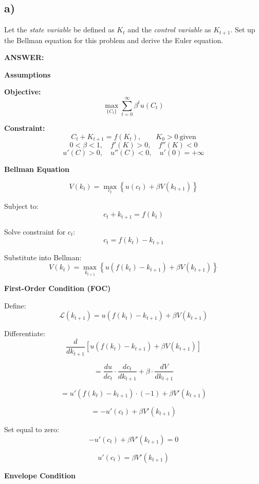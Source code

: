 \documentclass[12pt]{article}
\begin{document}
\doublespacing

\subsection*{\noindent\textbf{a)}}

\noindent Let the \textit{state variable} be defined as \( K_t \) and the \textit{control variable} as \( K_{t+1} \). Set up the Bellman equation for this problem and derive the Euler equation.

\vspace{0.5em}
\noindent\textcolor{formalred}{\textbf{ANSWER:}}

\singlespacing
\textbf{Assumptions}

\textbf{Objective:}
\[
\max_{\{C_t\}} \sum_{t=0}^{\infty} \beta^t u(C_t)
\]

\textbf{Constraint:}
\[
C_t + K_{t+1} = f(K_t), 
\qquad K_0>0 \ \text{given}
\]
\[
0<\beta<1,\quad f'(K)>0,\quad f''(K)<0
\]
\[
u'(C)>0,\quad u''(C)<0,\quad u'(0)=+\infty
\]


\textbf{Bellman Equation}

\[
V(k_t) = \max_{c_t} \left\{ u(c_t) + \beta V(k_{t+1}) \right\}
\]

Subject to:
\[
c_t + k_{t+1} = f(k_t)
\]

Solve constraint for $c_t$:
\[
c_t = f(k_t) - k_{t+1}
\]

Substitute into Bellman:
\[
V(k_t) = \max_{k_{t+1}} \left\{ u(f(k_t) - k_{t+1}) + \beta V(k_{t+1}) \right\}
\]

\vspace{0.5cm}
\textbf{First-Order Condition (FOC)}

Define:
\[
\mathcal{L}(k_{t+1}) = u(f(k_t) - k_{t+1}) + \beta V(k_{t+1})
\]

Differentiate:
\[
\frac{d}{dk_{t+1}} \left[ u(f(k_t) - k_{t+1}) + \beta V(k_{t+1}) \right]
\]

\[
= \frac{du}{dc_t} \cdot \frac{dc_t}{dk_{t+1}} + \beta \cdot \frac{dV}{dk_{t+1}}
\]

\[
= u'(f(k_t) - k_{t+1}) \cdot (-1) + \beta V'(k_{t+1})
\]

\[
= -u'(c_t) + \beta V'(k_{t+1})
\]

Set equal to zero:
\[
-u'(c_t) + \beta V'(k_{t+1}) = 0
\]

\[
u'(c_t) = \beta V'(k_{t+1})
\]

\vspace{0.5cm}
\textbf{Envelope Condition}
\end{document}
